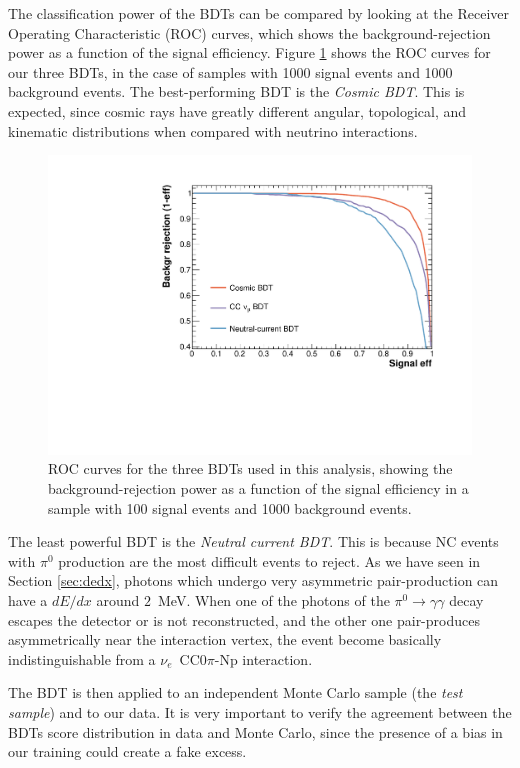 The classification power of the BDTs can be compared by looking at the Receiver Operating Characteristic (ROC) curves, which shows the background-rejection power as a function of the signal efficiency. Figure \ref{fig:roc} shows the ROC curves for our three BDTs, in the case of samples with 1000 signal events and 1000 background events. The best-performing BDT is the \emph{Cosmic BDT}. This is expected, since cosmic rays have greatly different angular, topological, and kinematic distributions when compared with neutrino interactions. 

\begin{figure}[htbp]
\centering
  \includegraphics[width=0.75\linewidth]{figures/roc.pdf}
  \caption{ROC curves for the three BDTs used in this analysis, showing the background-rejection power as a function of the signal efficiency in a sample with 100 signal events and 1000 background events.}\label{fig:roc}
\end{figure}

The least powerful BDT is the \emph{Neutral current BDT}. This is because NC events with $\pi^0$ production are the most difficult events to reject. As we have seen in Section \ref{sec:dedx}, photons which undergo very asymmetric pair-production can have a $dE/dx$ around $2$~MeV. When one of the photons of the $\pi^0\rightarrow\gamma\gamma$ decay escapes the detector or is not reconstructed, and the other one pair-produces asymmetrically near the interaction vertex, the event become basically indistinguishable from a $\nu_e$~CC0$\pi$-Np interaction.

The BDT is then applied to an independent Monte Carlo sample (the \emph{test sample}) and to our data. It is very important to verify the agreement between the BDTs score distribution in data and Monte Carlo, since the presence of a bias in our training could create a fake excess.

